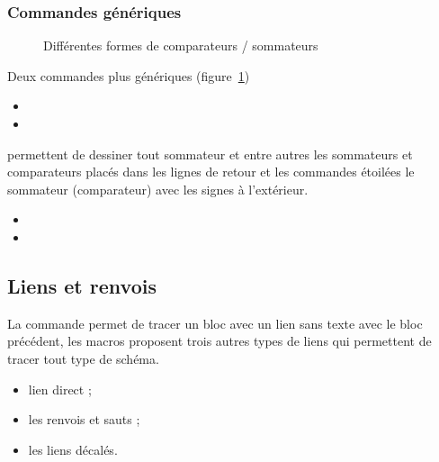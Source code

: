 \documentclass[a4paper,11pt]{article}                      %
\begin{document}
\subsubsection{Commandes génériques}



\begin{figure}[!htb]
\centering
\begin{tikzexample}[title=,   righthand width=0.5\textwidth,]
\end{tikzexample}

\begin{tikzexample}[title=,   righthand width=0.5\textwidth,]
\end{tikzexample}
\caption{Différentes formes de comparateurs / sommateurs}
\label{fig:compsum1}
\end{figure}


Deux commandes plus génériques (figure~\ref{fig:compsum1})
\begin{itemize}
\item  {}
\item {}
\end{itemize}
permettent  de dessiner tout sommateur et entre autres les sommateurs et comparateurs placés dans les lignes de retour  et les commandes étoilées  le sommateur (comparateur) avec les signes à l'extérieur.
\begin{itemize}
\item  {}
\item {}
\end{itemize} 



\subsection{Liens et renvois}
La commande  permet de tracer un bloc avec un lien sans texte avec le bloc précédent, les macros proposent trois autres types de liens qui permettent de tracer tout type de schéma.
\begin{itemize}
\item lien direct  ;
\item les renvois et sauts ;
\item les liens décalés.
\end{itemize}
\end{document}

